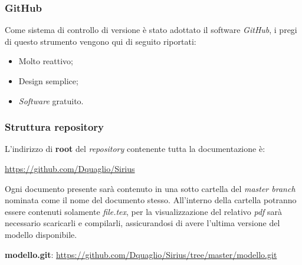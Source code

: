 \subsubsection{GitHub}
Come sistema di controllo di versione è stato adottato il software \textit{GitHub}, i pregi di questo strumento vengono qui di seguito riportati:
\begin{itemize}
\item Molto reattivo;
\item Design semplice; 
\item \textit{Software} gratuito.
\end{itemize}

\subsubsection{Struttura repository}
L'indirizzo di \textbf{root} del \textit{repository} contenente tutta la documentazione è:
\begin{center}
\href{https://github.com/Dquaglio/Sirius}{https://github.com/Dquaglio/Sirius}
\end{center}

Ogni documento presente sarà contenuto in una sotto cartella del \textit{master branch} nominata come il nome del documento stesso.
All'interno della cartella potranno essere contenuti solamente \textit{file.tex}, per la visualizzazione del relativo \textit{pdf} sarà necessario scaricarli e compilarli, assicurandosi di avere l'ultima versione del modello disponibile.
\begin{center}
\textbf{modello.git}: \href{https://github.com/Dquaglio/Sirius/tree/master/modello.git}{https://github.com/Dquaglio/Sirius/tree/master/modello.git}
\end{center}

